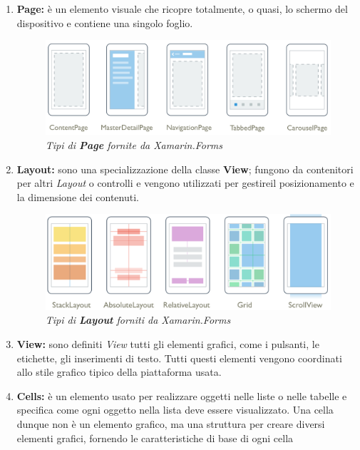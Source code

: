 \begin{enumerate}
	\item \textbf{Page:} è un elemento visuale che ricopre totalmente, o quasi, lo schermo del dispositivo e contiene una singolo foglio.
	
	\begin{figure}[ht]
		\centering
		\includegraphics[scale=0.25]{immagini/progettazione/page-types.png}
		\caption{\textit{Tipi di \textbf{Page} fornite da Xamarin.Forms}}
	\end{figure}\FloatBarrier
	
	\item \textbf{Layout:} sono una specializzazione della classe \textbf{View}; fungono da contenitori per altri \textit{Layout} o controlli e vengono utilizzati per gestireil posizionamento e la dimensione dei contenuti.
	
		\begin{figure}[ht]
			\centering
			\includegraphics[scale=0.25]{immagini/progettazione/Layouts.png}
			\caption{\textit{Tipi di \textbf{Layout} forniti da Xamarin.Forms}}
		\end{figure}\FloatBarrier
		
		\item \textbf{View:} sono definiti \textit{View} tutti gli elementi grafici, come i pulsanti, le etichette, gli inserimenti di testo. Tutti questi elementi vengono coordinati allo stile grafico tipico della piattaforma usata.
		
		\item \textbf{Cells:} è un elemento usato per realizzare oggetti nelle liste o nelle tabelle e specifica come ogni oggetto nella lista deve essere visualizzato. Una cella dunque non è un elemento grafico, ma una struttura per creare diversi elementi grafici, fornendo le caratteristiche di base di ogni cella
		
\end{enumerate}

